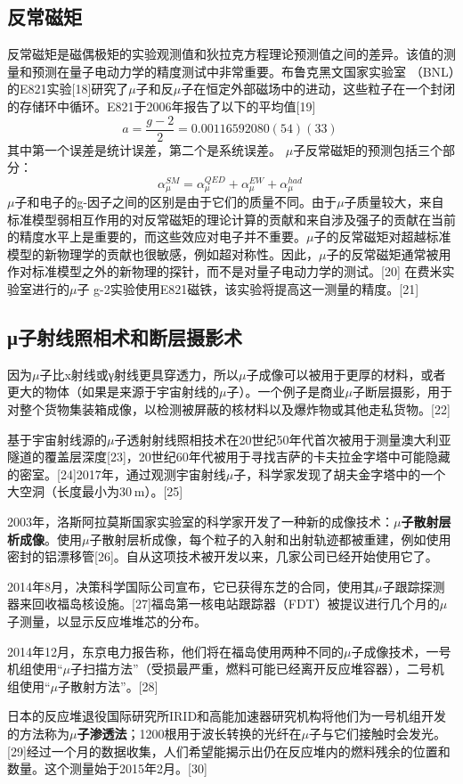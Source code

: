 \subsection{反常磁矩}
反常磁矩是磁偶极矩的实验观测值和狄拉克方程理论预测值之间的差异。该值的测量和预测在量子电动力学的精度测试中非常重要。布鲁克黑文国家实验室 （BNL）的E821实验[18]研究了$\mu$子和反$\mu$子在恒定外部磁场中的进动，这些粒子在一个封闭的存储环中循环。E821于2006年报告了以下的平均值[19]\begin{equation}
a=\frac{g-2}{2}=0.00116592080(54)(33)~
\end{equation}
其中第一个误差是统计误差，第二个是系统误差。
$\mu$子反常磁矩的预测包括三个部分：
\begin{equation}
\alpha_\mu^{SM}=\alpha_\mu^{QED}+\alpha^{EW}_\mu+\alpha_\mu^{had}~
\end{equation}
$\mu$子和电子的g-因子之间的区别是由于它们的质量不同。由于$\mu$子质量较大，来自标准模型弱相互作用的对反常磁矩的理论计算的贡献和来自涉及强子的贡献在当前的精度水平上是重要的，而这些效应对电子并不重要。$\mu$子的反常磁矩对超越标准模型的新物理学的贡献也很敏感，例如超对称性。因此，$\mu$子的反常磁矩通常被用作对标准模型之外的新物理的探针，而不是对量子电动力学的测试。[20] 在费米实验室进行的$\mu$子 g-2实验使用E821磁铁，该实验将提高这一测量的精度。[21]
\subsection{μ子射线照相术和断层摄影术}
因为$\mu$子比x射线或γ射线更具穿透力，所以$\mu$子成像可以被用于更厚的材料，或者更大的物体（如果是来源于宇宙射线的$\mu$子）。一个例子是商业$\mu$子断层摄影，用于对整个货物集装箱成像，以检测被屏蔽的核材料以及爆炸物或其他走私货物。[22]

基于宇宙射线源的$\mu$子透射射线照相技术在20世纪50年代首次被用于测量澳大利亚隧道的覆盖层深度[23]，20世纪60年代被用于寻找吉萨的卡夫拉金字塔中可能隐藏的密室。[24]2017年，通过观测宇宙射线$\mu$子，科学家发现了胡夫金字塔中的一个大空洞（长度最小为30 m）。[25]

2003年，洛斯阿拉莫斯国家实验室的科学家开发了一种新的成像技术：\textbf{$\mu$子散射层析成像}。使用$\mu$子散射层析成像，每个粒子的入射和出射轨迹都被重建，例如使用密封的铝漂移管[26]。自从这项技术被开发以来，几家公司已经开始使用它了。

2014年8月，决策科学国际公司宣布，它已获得东芝的合同，使用其$\mu$子跟踪探测器来回收福岛核设施。[27]福岛第一核电站跟踪器（FDT）被提议进行几个月的$\mu$子测量，以显示反应堆堆芯的分布。

2014年12月，东京电力报告称，他们将在福岛使用两种不同的$\mu$子成像技术，一号机组使用“$\mu$子扫描方法”（受损最严重，燃料可能已经离开反应堆容器），二号机组使用“$\mu$子散射方法”。[28]

日本的反应堆退役国际研究所IRID和高能加速器研究机构将他们为一号机组开发的方法称为\textbf{$\mu$子渗透法}；1200根用于波长转换的光纤在$\mu$子与它们接触时会发光。[29]经过一个月的数据收集，人们希望能揭示出仍在反应堆内的燃料残余的位置和数量。这个测量始于2015年2月。[30]
